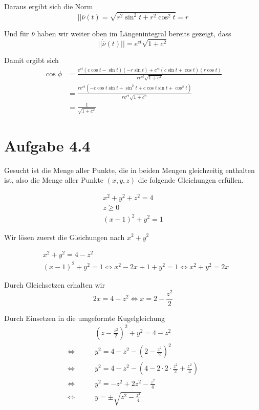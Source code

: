 \documentclass[a4paper,german,12pt,smallheadings]{scrartcl}
\begin{document}
\begin{enumerate}[(1)]
    Daraus ergibt sich die Norm
    \begin{equation*}
      ||\dot{\overline{\nu}}(t) = \sqrt{r^2 \sin^2 t + r^2 \cos^2 t} = r
    \end{equation*}

    Und für $\overline{\nu}$ haben wir weiter oben im Längenintegral bereits gezeigt, dass
    \begin{equation*}
      ||\dot{\overline{\nu}}(t)|| = e^{ct} \sqrt{1+c^2}
    \end{equation*}

    Damit ergibt sich
    \begin{align*}
      \cos \phi &= \frac{e^{ct} (c \cos t - \sin t)(-r \sin t) + e^{ct} (c \sin t + \cos t)(r \cos t)}{re^{ct}\sqrt{1+c^2}} \\
                &= \frac{re^{ct} (-c\cos t \sin t + \sin^2 t + c \cos t \sin t + \cos^2 t)}{re^{ct} \sqrt{1+c^2}} \\
                &= \frac{1}{\sqrt{1+c^2}}
    \end{align*}
\end{enumerate}

\section*{Aufgabe 4.4}
Gesucht ist die Menge aller Punkte, die in beiden Mengen gleichzeitig enthalten
ist, also die Menge aller Punkte $(x,y,z)$ die folgende Gleichungen erfüllen.

\begin{align*}
  x^2+y^2+z^2 = 4 \\
  z \ge 0 \\
  (x-1)^2 + y^2 = 1
\end{align*}

Wir lösen zuerst die Gleichungen nach $x^2+y^2$

\begin{align*}
  &x^2 + y^2 = 4 - z^2 \\
  &(x-1)^2 + y^2 = 1 \Leftrightarrow x^2 - 2x + 1 + y^2 = 1 \Leftrightarrow x^2+y^2 = 2x
\end{align*}

Durch Gleichsetzen erhalten wir
\begin{equation*}
  2x = 4 - z^2 \Leftrightarrow x = 2 - \frac{z^2}{2}
\end{equation*}

Durch Einsetzen in die umgeformte Kugelgleichung
\begin{align*}
  &\left(z - \frac{z^2}{2}\right)^2 + y^2 = 4 - z^2 \\
  \Leftrightarrow\qquad &y^2 = 4 - z^2 - \left(2 - \frac{z^2}{2}\right)^2 \\
  \Leftrightarrow\qquad &y^2 = 4 - z^2 - \left(4 - 2\cdot2\cdot\frac{z^2}{2} + \frac{z^2}{4}\right) \\
  \Leftrightarrow\qquad &y^2 = - z^2 + 2z^2 - \frac{z^2}{4} \\
  \Leftrightarrow\qquad &y = \pm \sqrt{z^2 - \frac{z^4}{4}} \\
\end{align*}
\end{document}
